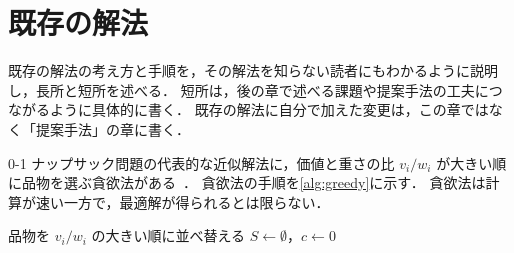 
\section{既存の解法}
\label{sec:greedy}

\begin{writingnote}
既存の解法の考え方と手順を，その解法を知らない読者にもわかるように説明し，長所と短所を述べる．
短所は，後の章で述べる課題や提案手法の工夫につながるように具体的に書く．
既存の解法に自分で加えた変更は，この章ではなく「提案手法」の章に書く．
\end{writingnote}

0-1 ナップサック問題の代表的な近似解法に，価値と重さの比 $v_i / w_i$ が大きい順に品物を選ぶ貪欲法がある~\cite{dantzig1957discrete}．
貪欲法の手順を\cref{alg:greedy}に示す．
貪欲法は計算が速い一方で，最適解が得られるとは限らない．

\begin{algorithm}[tbp]
  \caption{0-1 ナップサック問題に対する貪欲法}
  \label{alg:greedy}
  品物を $v_i / w_i$ の大きい順に並べ替える\;
  $S \gets \emptyset$，$c \gets 0$ 
  \;
\end{algorithm}
